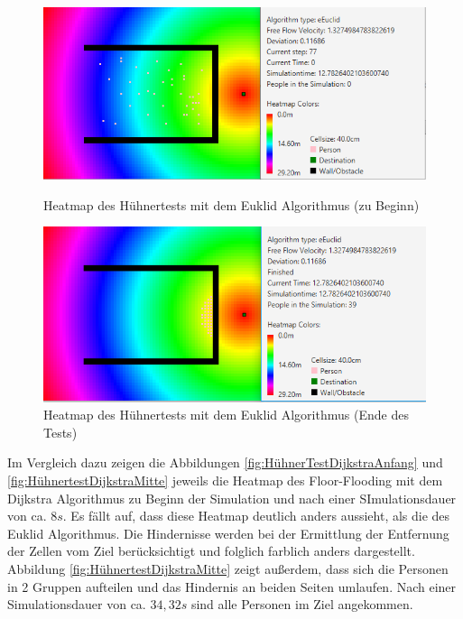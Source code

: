 \begin{figure}[!htb]
	\centering
	\begin{minipage}{.5\textwidth}
		\centering
		\includegraphics[width=\textwidth]{abbildungen/ChickenTest1BeginEuclid.PNG}
		\caption{Heatmap des Hühnertests mit dem Euklid Algorithmus (zu Beginn)}
		\label{fig:HühnerTestEuklidAnfang}
	\end{minipage}%
	\begin{minipage}{0.5\textwidth}
		\centering
		\includegraphics[width=\textwidth]{abbildungen/ChickenTest1EndEuclid.PNG}
		\caption{Heatmap des Hühnertests mit dem Euklid Algorithmus (Ende des Tests)}
		\label{fig:HühnertestEuklidEnde}
	\end{minipage}
\end{figure}

Im Vergleich dazu zeigen die Abbildungen \ref{fig:HühnerTestDijkstraAnfang} und \ref{fig:HühnertestDijkstraMitte} jeweils die Heatmap des Floor-Flooding mit dem Dijkstra Algorithmus zu Beginn der Simulation und nach einer SImulationsdauer von ca. $8s$. Es fällt auf, dass diese Heatmap deutlich anders aussieht, als die des Euklid Algorithmus. Die Hindernisse werden bei der Ermittlung der Entfernung der Zellen vom Ziel berücksichtigt und folglich farblich anders dargestellt. Abbildung \ref{fig:HühnertestDijkstraMitte} zeigt außerdem, dass sich die Personen in 2 Gruppen aufteilen und das Hindernis an beiden Seiten umlaufen. Nach einer Simulationsdauer von ca. $34,32s$ sind alle Personen im Ziel angekommen.

